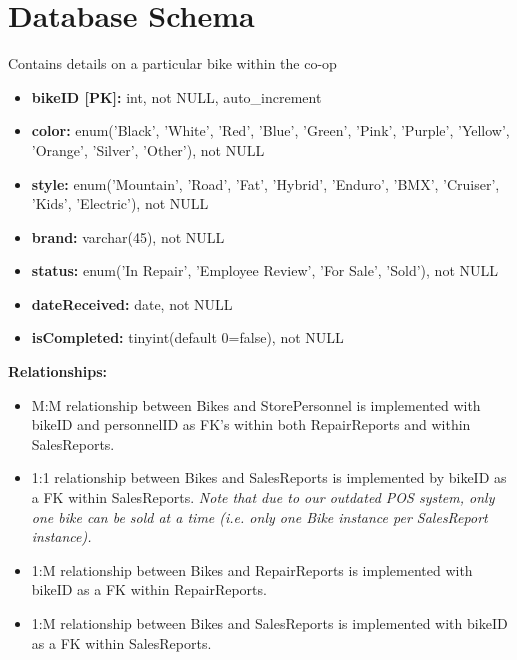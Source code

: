 \documentclass{article}
\begin{document}
\vspace{0.5cm}

\section{Database Schema}

\begin{tcolorbox}[colback=secondarycolor, colframe=primarycolor, title=\textbf{Bikes Table}]
Contains details on a particular bike within the co-op
\vspace{0.2cm}

\begin{itemize}
  \item \textbf{bikeID [PK]:} int, not NULL, auto\_increment
  \item \textbf{color:} enum('Black', 'White', 'Red', 'Blue', 'Green', 'Pink', 'Purple', 'Yellow', 'Orange', 'Silver', 'Other'), not NULL 
  \item \textbf{style:} enum('Mountain', 'Road', 'Fat', 'Hybrid', 'Enduro', 'BMX', 'Cruiser', 'Kids', 'Electric'), not NULL
  \item \textbf{brand:} varchar(45), not NULL
  \item \textbf{status:} enum('In Repair', 'Employee Review', 'For Sale', 'Sold'), not NULL
  \item \textbf{dateReceived:} date, not NULL
  \item \textbf{isCompleted:} tinyint(default 0=false), not NULL
\end{itemize}
\vspace{0.2cm}

\textbf{Relationships:}
\vspace{0.2cm}
\begin{itemize}
  \item M:M relationship between Bikes and StorePersonnel is implemented with bikeID and personnelID as FK's within both RepairReports and within SalesReports.
  \item 1:1 relationship between Bikes and SalesReports is implemented by bikeID as a FK within SalesReports. \textit{Note that due to our outdated POS system, only one bike can be sold at a time (i.e. only one Bike instance per SalesReport instance).}
  \item 1:M relationship between Bikes and RepairReports is implemented with bikeID as a FK within RepairReports.
  \item 1:M relationship between Bikes and SalesReports is implemented with bikeID as a FK within SalesReports.
\end{itemize}
\end{tcolorbox}
\end{document}
